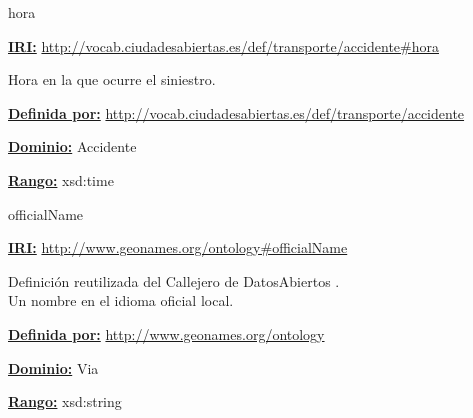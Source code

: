 \begin{mybox}{hora}
\begin{flushleft}
\underline{\textbf{IRI:}}
\url{http://vocab.ciudadesabiertas.es/def/transporte/accidente#hora}
\newline

Hora en la que ocurre el siniestro.
\newline

\underline{\textbf{Definida por:}}\newline
\url{http://vocab.ciudadesabiertas.es/def/transporte/accidente}
\newline

\underline{\textbf{Dominio:}}  Accidente
\newline

\underline{\textbf{Rango:}}  xsd:time
\newline

\end{flushleft}
\end{mybox}



\begin{mybox}{officialName}
\begin{flushleft}
\underline{\textbf{IRI:}}
\url{http://www.geonames.org/ontology#officialName}
\newline

Definición reutilizada del Callejero de DatosAbiertos \cite{ciudadesbiertas_callejero}.
\\Un nombre en el idioma oficial local.
\newline


\underline{\textbf{Definida por:}}\newline
\url{http://www.geonames.org/ontology}
\newline

\underline{\textbf{Dominio:}}	Via
\newline

\underline{\textbf{Rango:}}  xsd:string
\newline

\end{flushleft}
\end{mybox}




